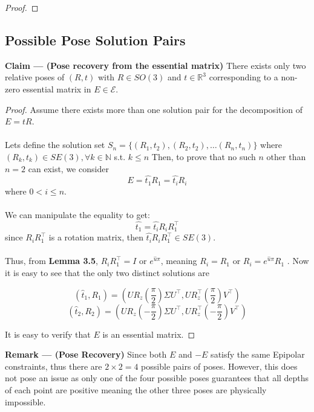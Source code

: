 \documentclass{article}
\begin{document}
\begin{proof}
\end{proof}

\newpage
\subsection{Possible Pose Solution Pairs}
\begin{tcolorbox}[enhanced,breakable,sharp corners, colback=green!5!white, colframe=green!55!black, boxrule=0mm,top=0mm,bottom=0mm,leftrule=1mm]
    {\color{green!55!black} \textbf{Claim --- (Pose recovery from the essential matrix)}} There exists only two relative poses of $(R, t)$ with $R \in SO(3)$ and $t\in \mathbb{R}^3$ corresponding to a non-zero essential matrix in $E\in \mathcal{E}$.
\end{tcolorbox}
\begin{proof}
   Assume there exists more than one solution pair for the decomposition of $E=tR$.\\\\
   Lets define the solution set $S_n = \{(R_1, t_2), (R_2, t_2), \ldots (R_n, t_n)\}$ where $(R_k, t_k) \in SE(3), \forall k \in \mathbb{N} $ s.t. $k \leq n$ 
   Then, to prove that no such $n$ other than $n=2$ can exist, we consider $$E = \hat{t_1}R_1 = \hat{t_i}R_i$$ where $0 < i \leq n$.\\\\
   We can manipulate the equality to get:
    $$\hat{t_1} = \hat{t_i}R_iR_1^\top$$
    since $R_iR_1^\top$ is a rotation matrix, then $\hat{t_i}R_iR_1^\top \in SE(3)$.\\\\
    Thus, from \textbf{Lemma 3.5}, $R_iR_1^\top = I$ or $e^{\hat{u}\pi}$, meaning $R_i = R_1$ or $R_i = e^{\hat{u}\pi}R_1$ . Now it is easy to see that the only two distinct solutions are 
    \begin{tcolorbox}[enhanced,breakable, colback=blue!5!white, colframe=blue!55!black, boxrule=0.5pt, arc=4pt, boxsep=0pt, left=6pt, right=6pt, drop shadow=black!40!white]
$$(\hat{t}_1, R_1) = (UR_z(\frac{\pi}{2})\Sigma U^\top, UR_z^\top(\frac{\pi}{2})V^\top)$$
$$(\hat{t}_2, R_2) = (UR_z(-\frac{\pi}{2})\Sigma U^\top, UR_z^\top(-\frac{\pi}{2})V^\top)$$
\end{tcolorbox}
It is easy to verify that $E$ is an essential matrix.

\end{proof}

\begin{tcolorbox}[enhanced,breakable,sharp corners, colback=black!5!white, colframe=black, boxrule=0mm,top=0mm,bottom=0mm,leftrule=1mm]
    \textbf{Remark --- (Pose Recovery)} Since both $E$ and $-E$ satisfy the same Epipolar constraints, thus there are $2 \times 2 = 4$ possible pairs of poses. However, this does not pose an issue as only one of the four possible poses guarantees that all depths of each point are positive meaning the other three poses are physically impossible. 
\end{tcolorbox}
\newpage
\end{document}
